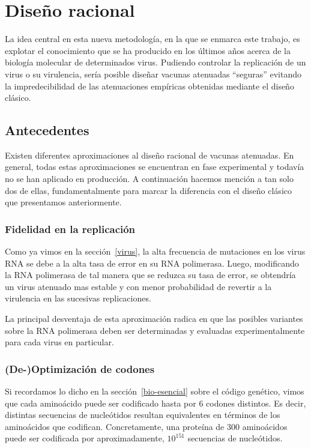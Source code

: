\section{Dise\~no racional}

La idea central en esta nueva metodolog\'ia, en la que se enmarca este trabajo,
es explotar el conocimiento que se ha producido en los \'ultimos a\~nos acerca
de la biolog\'ia molecular de determinados virus. Pudiendo controlar la
replicaci\'on de un virus o su virulencia, ser\'ia posible dise\~nar vacunas
atenuadas ``seguras'' evitando la impredecibilidad de las atenuaciones
emp\'iricas obtenidas mediante el dise\~no cl\'asico.

\subsection{Antecedentes}

Existen diferentes aproximaciones al dise\~no racional de vacunas
atenuadas\cite{Lauring10}. En general, todas estas aproximaciones se encuentran
en fase experimental y todav\'ia no se han aplicado en producci\'on. A
continuaci\'on hacemos menci\'on a tan solo dos de ellas, fundamentalmente para
marcar la diferencia con el dise\~no cl\'asico que presentamos anteriormente.

\subsubsection{Fidelidad en la replicaci\'on\cite{Vignuzzi08}} 

Como ya vimos en la secci\'on~\ref{virus}, la alta frecuencia de mutaciones en
los virus \ac{RNA} se debe a la alta tasa de error en su \ac{RNA} polimerasa.
Luego, modificando la \ac{RNA} polimerasa de tal manera que se reduzca su tasa
de error, se obtendr\'ia un virus atenuado mas estable y con menor probabilidad
de revertir a la virulencia en las sucesivas replicaciones. 

La principal desventaja de esta aproximaci\'on radica en que las
posibles variantes sobre la \ac{RNA} polimerasa deben ser determinadas y
evaluadas experimentalmente para cada virus en particular.

\subsubsection{(De-)Optimizaci\'on de codones\cite{Mueller10, Coleman08}} 

Si recordamos lo dicho en la secci\'on~\ref{bio-esencial} sobre el c\'odigo
gen\'etico, vimos que cada amino\'acido puede ser codificado hasta por 6
codones distintos. Es decir, distintas secuencias de nucle\'otidos resultan
equivalentes en t\'erminos de los amino\'acidos que codifican. Concretamente,
una prote\'ina de 300 amino\'acidos puede ser codificada por aproximadamente, 
$10^{151}$ secuencias de nucle\'otidos. 


